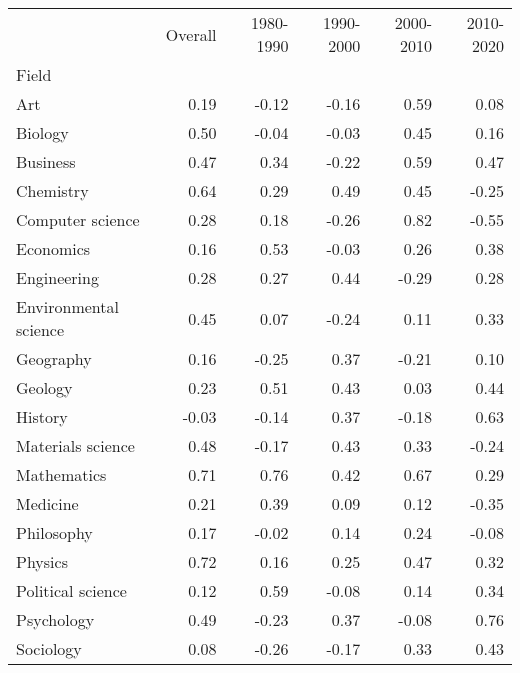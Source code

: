 \begin{tabular}{lrrrrr}
\toprule
 & Overall & 1980-1990 & 1990-2000 & 2000-2010 & 2010-2020 \\
Field &  &  &  &  &  \\
\midrule
Art & 0.19 & -0.12 & -0.16 & 0.59 & 0.08 \\
Biology & 0.50 & -0.04 & -0.03 & 0.45 & 0.16 \\
Business & 0.47 & 0.34 & -0.22 & 0.59 & 0.47 \\
Chemistry & 0.64 & 0.29 & 0.49 & 0.45 & -0.25 \\
Computer science & 0.28 & 0.18 & -0.26 & 0.82 & -0.55 \\
Economics & 0.16 & 0.53 & -0.03 & 0.26 & 0.38 \\
Engineering & 0.28 & 0.27 & 0.44 & -0.29 & 0.28 \\
Environmental science & 0.45 & 0.07 & -0.24 & 0.11 & 0.33 \\
Geography & 0.16 & -0.25 & 0.37 & -0.21 & 0.10 \\
Geology & 0.23 & 0.51 & 0.43 & 0.03 & 0.44 \\
History & -0.03 & -0.14 & 0.37 & -0.18 & 0.63 \\
Materials science & 0.48 & -0.17 & 0.43 & 0.33 & -0.24 \\
Mathematics & 0.71 & 0.76 & 0.42 & 0.67 & 0.29 \\
Medicine & 0.21 & 0.39 & 0.09 & 0.12 & -0.35 \\
Philosophy & 0.17 & -0.02 & 0.14 & 0.24 & -0.08 \\
Physics & 0.72 & 0.16 & 0.25 & 0.47 & 0.32 \\
Political science & 0.12 & 0.59 & -0.08 & 0.14 & 0.34 \\
Psychology & 0.49 & -0.23 & 0.37 & -0.08 & 0.76 \\
Sociology & 0.08 & -0.26 & -0.17 & 0.33 & 0.43 \\
\bottomrule
\end{tabular}
